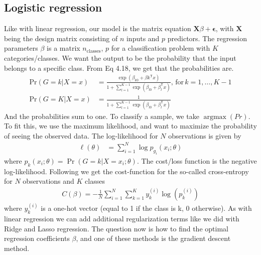 \documentclass[a4paper]{article}
\newcommand{\XX}{\mathbf{X}}
\newcommand{\T}{\mathsf{T}}
\newcommand{\pr}{\text{Pr}}
\begin{document}
\subsection{Logistic regression} \label{sec:logreg}
Like with linear regression, our model is the matrix equation $\XX\beta + \bm{\epsilon}$, with $\XX$ being the design matrix consisting of $n$ inputs and $p$ predictors. The regression parameters $\beta$ is a matrix $n_{\text{classes}}$, $p$ for a classification problem with $K$ categories/classes. We want the output to be the probability that the input belongs to a specific class. From \cite{Hastie} Eq 4.18, we get that the probabilities are.
\begin{align*}
	\pr(G = k | X = x) &= \frac{\exp(\beta_{k0}+\beta{k}^\T x)}{1 + \sum_{l=1}^{K-1}\exp(\beta_{l0} + \beta_l^\T x)}, \,\text{for}\,k=1, \dots, K-1\\
	\pr(G = K | X = x) &= \frac{1}{1 + \sum_{l=1}^{K-1}\exp(\beta_{l0} + \beta_l^\T x)}
\end{align*}
And the probabilities sum to one. To classify a sample, we take $\operatorname{argmax}(Pr)$. To fit this, we use the maximum likelihood, and want to maximize the probability of seeing the observed data. The log-likelihood for $N$ observations is given by
\begin{align*}
 \ell(\theta) &= \sum_{i=1}^N\log p_{g_i}(x_i;\theta)
\end{align*}
where $p_k(x_i;\theta) = \Pr(G=k|X=x_i;\theta)$. The cost/loss function is the negative log-likelihood. Following \cite{Geron} we get the cost-function for the so-called cross-entropy for $N$ observations and $K$ classes
\begin{align*}
	C(\beta) = -\frac{1}{N}\sum_{i=1}^N\sum_{k=1}^K y_k^{(i)}\log(p_k^{(i)})
\end{align*}
where $y_k^{(i)}$ is a one-hot vector (equal to 1 if the class is k, 0 otherwise). As with linear regression we can add additional regularization terms like we did with Ridge and Lasso regression. The question now is how to find the optimal regression coefficients $\beta$, and one of these methods is the gradient descent method.
\end{document}
